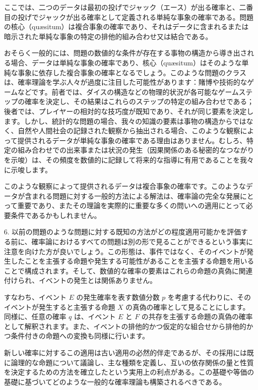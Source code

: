 \documentclass[a4paper,11pt,openany]{ltjsbook}
\begin{document}
ここでは、二つのデータは最初の投げでジャック（エース）が出る確率と、二番目の投げでジャックが出る確率として定義される単純な事象の確率である。問題の核心（qu\ae{}situm）は複合事象の確率であり、それはデータに含まれるまたは暗示された単純な事象の特定の排他的組み合わせ又は結合である。

おそらく一般的には、問題の数値的な条件が存在する事物の構造から導き出される場合、データは単純な事象の確率であり、核心（qu\ae{}situm）はそのような単純な事象に依存した複合事象の確率となるでしょう。このような問題のクラスは、確率理論を学ぶ人々が過度に注目した可能性があります：賭博や技術的なゲームなどです。前者では、ダイスの構造などの物理的状況が各可能なゲームステップの確率を決定し、その結果はこれらのステップの特定の組み合わせである；後者では、プレイヤーの相対的な技巧度が既知であり、それが同じ要素を決定します。しかし、統計的な問題の場合、我々の知識の要素は事物の構造からではなく、自然や人間社会の記録された観察から抽出される場合、このような観察によって提供されるデータが単純な事象の確率である理由はありません。むしろ、特定の組み合わせでの出来事または状況の発生（因果関係のある秘密的なつながりを示唆）は、その頻度を数値的に記録して将来的な指導に有用であることを我々に示唆します。

このような観察によって提供されるデータは複合事象の確率です。このようなデータが含まれる問題に対する一般的方法による解法は、確率論の完全な発展にとって重要であり、またその理論を実際的に重要な多くの問いへの適用にとって必要条件であるかもしれません。

6. 以前の問題のような問題に対する既知の方法がどの程度適用可能かを評価する前に、確率論におけるすべての問題は別の形で見ることができるという事実に注意を向けた方が良いでしょう。この形態は、事件ではなく、そのイベントが発生したことを主張する命題や発生する可能性があることを主張する命題を用いることで構成されます。そして、数値的な確率の要素はこれらの命題の真偽に関連付けられ、イベントの発生とは関係ありません。

すなわち、イベント $E$ の発生確率を表す数値分数 $p$ を考慮する代わりに、そのイベントが発生すると主張する命題 $X$ の真偽の確率として見ることにします。同様に、任意の確率 $q$ は、イベント $E$ と $F$ の共存を主張する命題の真偽の確率として解釈されます。また、イベントの排他的かつ仮定的な組合せから排他的かつ条件付きの命題への変換も同様に行います。

新しい確率に対するこの適用は古い適用の必然的伴走であるが、その採用には既に論理的な命題について議論し、主な種類を定義し、互いの依存関係の量と性質を決定するための方法を確立したという実用上の利点がある。この基礎や等価の基礎に基づいてどのような一般的な確率理論も構築されるべきである。
\end{document}
